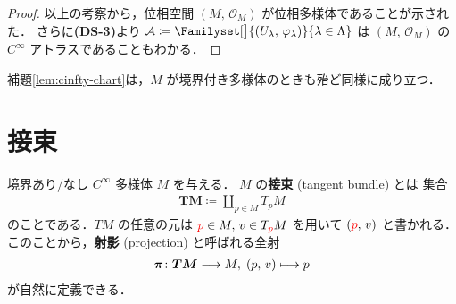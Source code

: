 \documentclass[TQFT_main]{subfiles}
\begin{document}
\begin{proof}
    以上の考察から，位相空間 $(M,\, \mathscr{O}_M)$ が位相多様体であることが示された．
	さらに\textsf{\textbf{(DS-3)}}より $\mathcal{A} \coloneqq \Familyset[\big]{(U_\lambda,\, \varphi_\lambda)}{\lambda \in \Lambda}$ は $(M,\, \mathscr{O}_M)$ の $C^\infty$ アトラスであることもわかる．


	
\end{proof}

補題\ref{lem:cinfty-chart}は，$M$ が境界付き多様体のときも殆ど同様に成り立つ．

\section{接束}

境界あり/なし $C^\infty$ 多様体 $M$ を与える．
$M$ の\textbf{接束} (tangent bundle) とは
集合
\begin{align}
    \bm{TM} \coloneqq \coprod_{p \in M} T_p M
\end{align}
のことである．$TM$ の任意の元は $\textcolor{red}{p} \in M,\, v \in T_{\textcolor{red}{p}} M$ を用いて $(\textcolor{red}{p},\, v)$ と書かれる．
このことから，\textbf{射影} (projection) と呼ばれる全射
\begin{align}
    \bm{\pi} \colon \bm{TM} \longrightarrow M,\; (p,\, v) \longmapsto p
\end{align}
が自然に定義できる．
\end{document}

